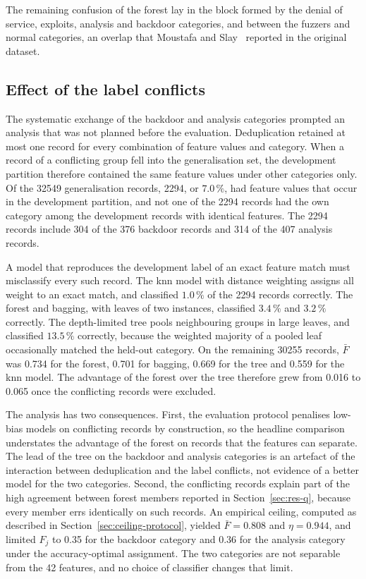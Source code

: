 The remaining confusion of the forest lay in the block formed by the
denial of service, exploits, analysis and backdoor categories, and between
the fuzzers and normal categories, an overlap that Moustafa and
Slay~\cite{moustafa2016} reported in the original dataset.

\subsection{Effect of the label conflicts}
\label{sec:res-conflict}

The systematic exchange of the backdoor and analysis categories prompted an
analysis that was not planned before the evaluation. Deduplication retained
at most one record for every combination of feature values and category.
When a record of a conflicting group fell into the generalisation set, the
development partition therefore contained the same feature values under
other categories only. Of the \num{32549} generalisation records, 2294, or
$7.0\,\%$, had feature values that occur in the development partition, and
not one of the 2294 records had the own category among the development
records with identical features. The 2294 records include 304 of the 376
backdoor records and 314 of the 407 analysis records.

A model that reproduces the development label of an exact feature match must
misclassify every such record. The \gls{knn} model with distance weighting
assigns all weight to an exact match, and classified $1.0\,\%$ of the 2294
records correctly. The forest and bagging, with leaves of two instances,
classified $3.4\,\%$ and $3.2\,\%$ correctly. The depth-limited tree pools
neighbouring groups in large leaves, and classified $13.5\,\%$ correctly,
because the weighted majority of a pooled leaf occasionally matched the
held-out category. On the remaining \num{30255} records, $\bar{F}$ was 0.734
for the forest, 0.701 for bagging, 0.669 for the tree and 0.559 for the
\gls{knn} model. The advantage of the forest over the tree therefore grew
from 0.016 to 0.065 once the conflicting records were excluded.

The analysis has two consequences. First, the evaluation protocol penalises
low-bias models on conflicting records by construction, so the headline
comparison understates the advantage of the forest on records that the
features can separate. The lead of the tree on the backdoor and analysis
categories is an artefact of the interaction between deduplication and the
label conflicts, not evidence of a better model for the two categories.
Second, the conflicting records explain part of the high agreement between
forest members reported in Section~\ref{sec:res-q}, because every member
errs identically on such records. An empirical ceiling, computed as
described in Section~\ref{sec:ceiling-protocol}, yielded $\bar{F} = 0.808$
and $\eta = 0.944$, and limited $F_j$ to 0.35 for the backdoor category and
0.36 for the analysis category under the accuracy-optimal assignment. The
two categories are not separable from the 42 features, and no choice of
classifier changes that limit.

